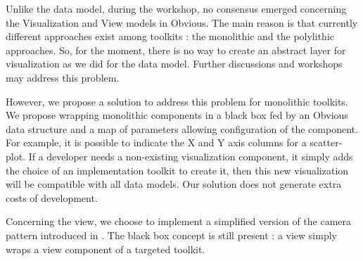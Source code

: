 Unlike the data model, during the workshop, no consensus emerged concerning the Visualization and View models in Obvious. The main reason is that currently different approaches exist among toolkits : the monolithic and the polylithic approaches. So, for the moment, there is no way to create an abstract layer for visualization as we did for the data model. Further discussions and workshops may address this problem.

However, we propose a solution to address this problem for monolithic toolkits. We propose wrapping monolithic components in a black box fed by an Obvious data structure and a map of parameters allowing configuration of the component. For example, it is possible to indicate the X and Y axis columns for a scatter-plot. If a developer needs a non-existing visualization component, it simply adds the choice of an implementation toolkit to create it, then this new visualization will be compatible with all data models. Our solution does not generate extra costs of development.


Concerning the view, we choose to implement a simplified version of the camera pattern introduced in \cite{DesignPatternsIV}. The black box concept is still present : a view simply wraps a view component of a targeted toolkit.

